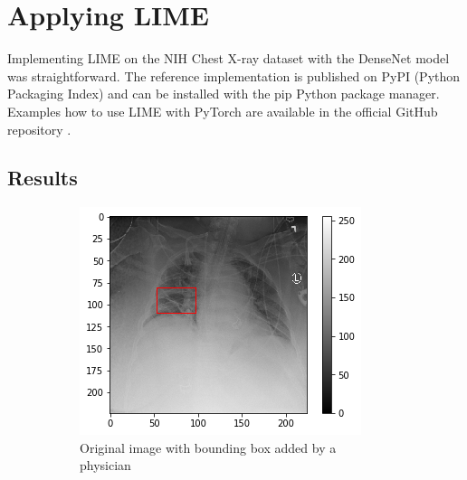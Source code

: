 \section{Applying LIME}
Implementing LIME on the NIH Chest X-ray dataset with the DenseNet model was straightforward. The reference implementation is published on PyPI (Python Packaging Index) and can be installed with the pip Python package manager. Examples how to use LIME with PyTorch are available in the official GitHub repository \cite{limegithub}.


\subsection{Results}


\begin{figure}[H]
    \centering
    \begin{subfigure}[t]{.45\textwidth}
        \centering
        \includegraphics[width=\linewidth]{chapters/03_classification/images/rise0_bbox.png}
        \caption{Original image with bounding box added by a physician}
    \end{subfigure}\hspace{1cm}%
    \begin{subfigure}[t]{.45\textwidth}
        \centering

\end{subfigure}
\end{figure}
